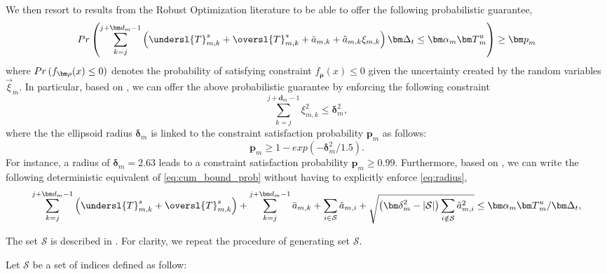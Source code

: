 We then resort to results from the Robust Optimization literature \cite{Elgh97,BenT98,BenT99,babonneau2009robust,hijazi2013robust} to be able to offer the following probabilistic guarantee,
\begin{equation}
\sc{Pr}\left(\sum\limits_{k=j}^{j+{\bm d}_m -1}\left(\undersl{T}^{s}_{m,k}   +  \oversl{T}^{s}_{m,k}  + \bar{a}_{m,k} + \hat{a}_{m,k} \xi_{m,k} \right) {\bm \Delta_t} \leq {\bm \alpha}_m {\bm T}^u_m\right) \ge {\bm p}_m \label{eq:cum_bound_prob}
\end{equation}
where $\sc{Pr}\left(f_{\bm \rho}(x) \le 0\right)$ denotes the probability of satisfying constraint $f_{\bm \rho}(x) \le 0$ given the uncertainty created by the random variables $\vec \xi_m$. In particular, based on \cite[Theorem 3.]{babonneau2009robust}, we can offer the above probabilistic guarantee by enforcing the following constraint
  \begin{equation}\label{eq:radius}
 \sum\limits_{k=j}^{j+{\bm d}_m -1} {\xi}_{m,k}^2 \le \bm{\delta}_m^2,
 \end{equation}
where the the ellipsoid radius $\bm{\delta}_m$ is linked to the constraint satisfaction probability ${\bm p}_m$ as follows:
$$\bm{p}_m \ge 1 - exp(-\bm{\delta}_m^2/1.5).$$ For instance, a radius of $\bm{\delta}_m = 2.63$  leads to a constraint satisfaction probability $\bm{p}_m \ge 0.99$. 
Furthermore, based on \cite[Corollary 1.]{hijazi2013robust}, we can write the following deterministic equivalent of \eqref{eq:cum_bound_prob} without having to explicitly enforce \eqref{eq:radius},
\begin{equation}
\sum\limits_{k=j}^{j+{\bm d}_m -1}\left(\undersl{T}^{s}_{m,k}   +  \oversl{T}^{s}_{m,k} \right) + \sum\limits_{k=j}^{j+{\bm d}_m -1} \bar{a}_{m,k}  + \sum\limits_{i \in \mathcal{S}} \hat{a}_{m,i} + \sqrt{\left({\bm \delta}_m^2 - |\mathcal{S}|\right) \sum\limits_{i \notin \mathcal{S}} \hat{a}^2_{m,i}  } \leq {\bm \alpha}_m {\bm T}^u_m/{\bm \Delta_t}, 
\label{eq:cum_bound_det}
\end{equation}

\noindent The set $\mathcal{S}$ is described in \cite[Proposition 1.]{hijazi2013robust}. For clarity, we repeat the procedure of generating set $\mathcal{S}$. 

\noindent Let $\mathcal{S}$ be a set of indices defined as follow:


